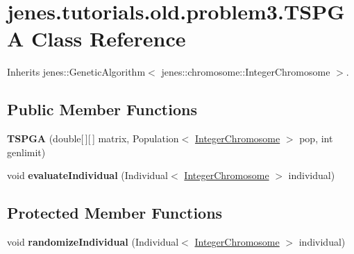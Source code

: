 \hypertarget{classjenes_1_1tutorials_1_1old_1_1problem3_1_1_t_s_p_g_a}{
\section{jenes.tutorials.old.problem3.TSPGA Class Reference}
\label{classjenes_1_1tutorials_1_1old_1_1problem3_1_1_t_s_p_g_a}
}
Inherits jenes::GeneticAlgorithm$<$ jenes::chromosome::IntegerChromosome $>$.

\subsection*{Public Member Functions}
\begin{CompactItemize}
\item 
\hypertarget{classjenes_1_1tutorials_1_1old_1_1problem3_1_1_t_s_p_g_a_ee42308116b327b1b73b5996bcb39aba}{
\textbf{TSPGA} (double\mbox{[}$\,$\mbox{]}\mbox{[}$\,$\mbox{]} matrix, Population$<$ \hyperlink{classjenes_1_1chromosome_1_1_integer_chromosome}{IntegerChromosome} $>$ pop, int genlimit)}
\label{classjenes_1_1tutorials_1_1old_1_1problem3_1_1_t_s_p_g_a_ee42308116b327b1b73b5996bcb39aba}

\item 
\hypertarget{classjenes_1_1tutorials_1_1old_1_1problem3_1_1_t_s_p_g_a_4485dcb637c0d0352c4372e4bef4da18}{
void \textbf{evaluateIndividual} (Individual$<$ \hyperlink{classjenes_1_1chromosome_1_1_integer_chromosome}{IntegerChromosome} $>$ individual)}
\label{classjenes_1_1tutorials_1_1old_1_1problem3_1_1_t_s_p_g_a_4485dcb637c0d0352c4372e4bef4da18}

\end{CompactItemize}
\subsection*{Protected Member Functions}
\begin{CompactItemize}
\item 
\hypertarget{classjenes_1_1tutorials_1_1old_1_1problem3_1_1_t_s_p_g_a_e2fb356349da4c72fec6398f226877c9}{
void \textbf{randomizeIndividual} (Individual$<$ \hyperlink{classjenes_1_1chromosome_1_1_integer_chromosome}{IntegerChromosome} $>$ individual)}
\label{classjenes_1_1tutorials_1_1old_1_1problem3_1_1_t_s_p_g_a_e2fb356349da4c72fec6398f226877c9}

\end{CompactItemize}


